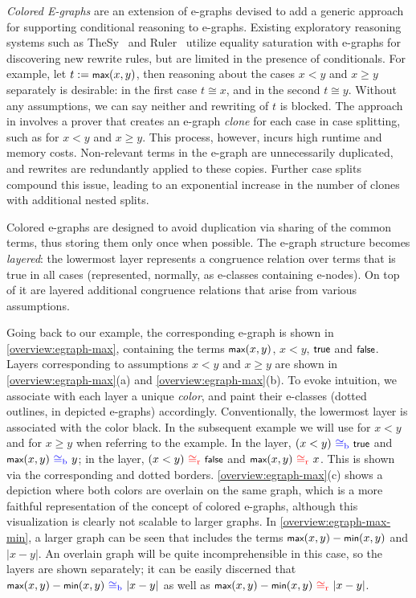 \emph{Colored E-graphs} are an extension of e-graphs devised to add a generic approach for supporting conditional reasoning to e-graphs.
Existing exploratory reasoning systems such as TheSy~\cite{thesy} and Ruler~\cite{ruler} utilize equality saturation with e-graphs for discovering new rewrite rules, but are limited in the presence of conditionals.
For example, let $t := \tmax(x, y)$, then reasoning about the cases $x < y$ and $x \geq y$ separately is desirable: in the first case $t \cong x$, and in the second $t \cong y$.
Without any assumptions, we can say neither and rewriting of $t$ is blocked.
The approach in \cite{thesy} involves a prover that creates an e-graph \emph{clone} for each case in case splitting, such as for $x < y$ and $x \geq y$. 
This process, however, incurs high runtime and memory costs. 
Non-relevant terms in the e-graph are unnecessarily duplicated, and rewrites are redundantly applied to these copies. 
Further case splits compound this issue, leading to an exponential increase in the number of clones with additional nested splits.


Colored e-graphs are designed to avoid duplication via sharing of the common terms, thus storing them only once when possible.
The e-graph structure becomes \emph{layered}:
the lowermost layer represents a congruence relation over terms that is true in all cases (represented, normally, as e-classes containing e-nodes).
On top of it are layered additional congruence relations that arise from various assumptions.


Going back to our example, the corresponding e-graph is
shown in \autoref{overview:egraph-max},
containing the terms $\tmax(x, y)$, $x < y$, $\ttrue$ and $\tfalse$.
Layers corresponding to assumptions $x < y$ and $x \geq y$ are shown in \ref{overview:egraph-max}(a) and \ref{overview:egraph-max}(b).
To evoke intuition, we associate with each layer a unique \emph{color}, and paint their e-classes (dotted outlines, in depicted e-graphs) accordingly.
Conventionally, the lowermost layer is associated with the color black.
In the subsequent example we will use \cblue for $x<y$ and \cred for $x\geq y$ when referring to the example.
In the \cblue layer, $(x < y) \congblue \ttrue$ and
$\tmax(x, y) \congblue y$;
in the \cred layer, $(x < y) \congred \tfalse$
and $\tmax(x, y) \congred x$.
This is shown via the corresponding 
\cblue and \cred dotted borders.
\autoref{overview:egraph-max}(c) shows a depiction where both colors are overlain on the same graph, which is a more faithful representation of the concept of colored e-graphs,
although this visualization is clearly not scalable to larger graphs.
In \autoref{overview:egraph-max-min}, a larger graph can be seen that includes the terms $\tmax(x,y)-\tmin(x,y)$ and $|x-y|$.
An overlain graph will be quite incomprehensible in this case, so the layers are shown separately; it can be easily discerned that $\tmax(x,y)-\tmin(x,y) \congblue |x-y|$
as well as $\tmax(x,y)-\tmin(x,y) \congred |x-y|$.


